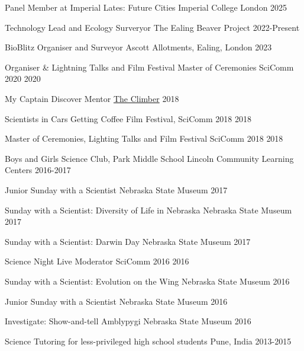 

\begin{cvoutreaches}


  \cvoutreach
    {Panel Member at Imperial Lates: Future Cities}
    {Imperial College London}
    {2025}

  \cvoutreach
    {Technology Lead and Ecology Surveryor}
    {The Ealing Beaver Project}
    {2022-Present}

  \cvoutreach
    {BioBlitz Organiser and Surveyor}
    {Ascott Allotments, Ealing, London}
    {2023}

 \cvoutreach
    {Organiser \& Lightning Talks and Film Festival Master of Ceremonies}
    {SciComm 2020}
    {2020}

 \cvoutreach
    {My Captain Discover Mentor}
    {\href{https://www.mycaptain.in/}{The Climber}}
    {2018}

 \cvoutreach
    {Scientists in Cars Getting Coffee}
    {Film Festival, SciComm 2018}
    {2018}

 \cvoutreach
    {Master of Ceremonies, Lighting Talks and Film Festival}
    {SciComm 2018}
    {2018}

  \cvoutreach
    {Boys and Girls Science Club, Park Middle School}
    {Lincoln Community Learning Centers}
    {2016-2017}

  \cvoutreach
    {Junior Sunday with a Scientist}
    {Nebraska State Museum}
    {2017}

   \cvoutreach
     {Sunday with a Scientist: Diversity of Life in Nebraska}
     {Nebraska State Museum}
     {2017}

   \cvoutreach
     {Sunday with a Scientist: Darwin Day}
     {Nebraska State Museum}
     {2017}

   \cvoutreach
     {Science Night Live Moderator}
     {SciComm 2016}
     {2016}

   \cvoutreach
     {Sunday with a Scientist: Evolution on the Wing}
     {Nebraska State Museum}
     {2016}

   \cvoutreach
     {Junior Sunday with a Scientist}
     {Nebraska State Museum}
     {2016}

   \cvoutreach
     {Investigate: Show-and-tell Amblypygi}
     {Nebraska State Museum}
     {2016}

  \cvoutreach
     {Science Tutoring for less-privileged high school students}
     {Pune, India}
     {2013-2015}

\end{cvoutreaches}
